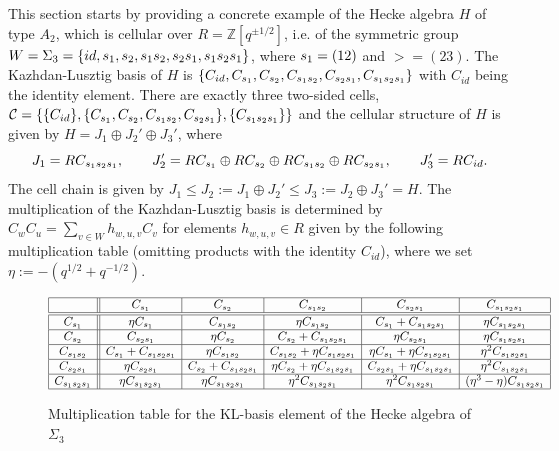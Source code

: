 \documentclass[oneside, a4paper, 11pt]{amsart}
\newcommand{\ZZ}{\mathbb{Z}}
\begin{document}
This section starts by providing a concrete example of the Hecke algebra $H$
of type $A_2$, which is cellular over $R=\ZZ[q^{\pm 1/2}]$,  i.e.\!\!\! of the
symmetric group $W=\Sigma_3 = \{ id, s_1, s_2, s_1s_2,s_2s_1,s_1s_2s_1 \}$,
where $s_1=(12)$ and $\gt=(23)$. The Kazhdan-Lusztig basis of $H$ is
$\{C_{id}, C_{s_1}, C_{s_2}, C_{s_1s_2}, C_{s_2s_1}, C_{s_1s_2s_1} \}$
with $C_{id}$ being the identity element.
There are exactly three two-sided cells, $\mathcal{C}=\{ \{C_{id}\},
\{C_{s_1},C_{s_2},C_{s_1s_2},C_{s_2s_1}\}, \{C_{s_1s_2s_1}\}\}$ and the cellular structure of $H$ is given
by $H=J_1\oplus J_2' \oplus J_3'$, where
$$J_1 = RC_{s_1s_2s_1}, \qquad J_2' = RC_{s_1}\oplus RC_{s_2} \oplus RC_{s_1s_2} \oplus RC_{s_2s_1},
\qquad J_3'= RC_{id}.$$
The cell chain is given by $J_1 \leq J_2:=J_1\oplus J_2' \leq J_3:=
J_2\oplus J_3'=H$.
The multiplication of the Kazhdan-Lusztig basis is determined by $ C_w C_u =
\sum_{v\in W} h_{w,u,v} C_v$
for elements $h_{w,u,v}\in R$ given by the following multiplication table
(omitting products with the identity $C_{id}$), where we set
$\eta := -(q^{1/2}+q^{-1/2}).$
\begin{figure}[h]
$$\begin{array}{|c||c|c|c|c|c|}\hline
     &   C_{s_1}        & C_{s_2}          & C_{s_1s_2}          & C_{s_2s_1}                  & C_{s_1s_2s_1}\\\hline\hline
C_{s_1}  &  \eta C_{s_1}     & C_{s_1s_2}         & \eta C_{s_1s_2}      & C_{s_1} + C_{s_1s_2s_1}           & \eta C_{s_1s_2s_1} \\\hline
C_{s_2}  &  C_{s_2s_1}        & \eta C_{s_2}      & C_{s_2} + C_{s_1s_2s_1}       & \eta C_{s_2s_1}              & \eta C_{s_1s_2s_1} \\\hline
C_{s_1s_2} &  C_{s_1} + C_{s_1s_2s_1} & \eta C_{s_1s_2}     & C_{s_1s_2} + \eta C_{s_1s_2s_1}  & \eta C_{s_1} + \eta C_{s_1s_2s_1}   & \eta^2 C_{s_1s_2s_1} \\\hline
C_{s_2s_1} & \eta C_{s_2s_1}     & C_{s_2} + C_{s_1s_2s_1} & \eta C_{s_2} + \eta C_{s_1s_2s_1} & C_{s_2s_1} + \eta C_{s_1s_2s_1} & \eta^2 C_{s_1s_2s_1} \\\hline
C_{s_1s_2s_1} & \eta C_{s_1s_2s_1}   & \eta C_{s_1s_2s_1}  & \eta^2 C_{s_1s_2s_1}  & \eta^2C_{s_1s_2s_1}    & (\eta^3-\eta) C_{s_1s_2s_1} \\\hline
\end{array}$$
\caption{Multiplication table for the KL-basis element of the  Hecke algebra of $\Sigma_3$}\label{KL-mult}
\end{figure}

\medskip
\end{document}

